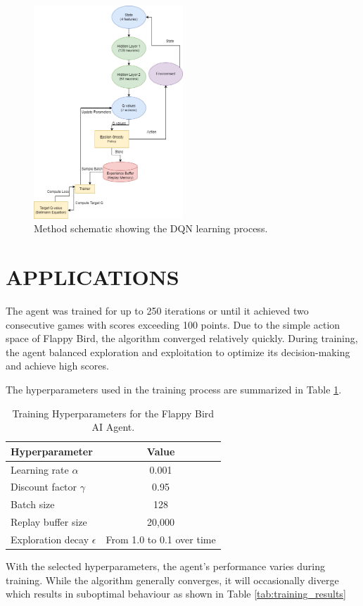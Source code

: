 \documentclass{lutmscthesis}[2017/10/03]
\begin{document}
\begin{figure}[ht!]
    \centering
    \includegraphics[width=0.5\textwidth, height=0.46\textwidth]{resources/DQN_diagram.png}
    \caption{Method schematic showing the DQN learning process.}
    \label{fig:dqn-method}
\end{figure}

\section{APPLICATIONS}
The agent was trained for up to 250 iterations or until it achieved two consecutive games with scores exceeding 100 points. Due to the simple action space of Flappy Bird, the algorithm converged relatively quickly. During training, the agent balanced exploration and exploitation to optimize its decision-making and achieve high scores.

The hyperparameters used in the training process are summarized in Table \ref{tab:hyperparameters}.

\begin{table}[h!]
\centering
\caption{Training Hyperparameters for the Flappy Bird AI Agent.}
\label{tab:hyperparameters}
\begin{tabular}{|l|c|}
\hline
\textbf{Hyperparameter} & \textbf{Value} \\
\hline
Learning rate \(\alpha\) & 0.001 \\
Discount factor \(\gamma\) & 0.95 \\
Batch size & 128 \\
Replay buffer size & 20,000 \\
Exploration decay \(\epsilon\) & From 1.0 to 0.1 over time \\
\hline
\end{tabular}
\end{table}

With the selected hyperparameters, the agent's performance varies during training. While the algorithm generally converges, it will occasionally diverge which results in suboptimal behaviour as shown in Table \ref{tab:training_results}
\end{document}
